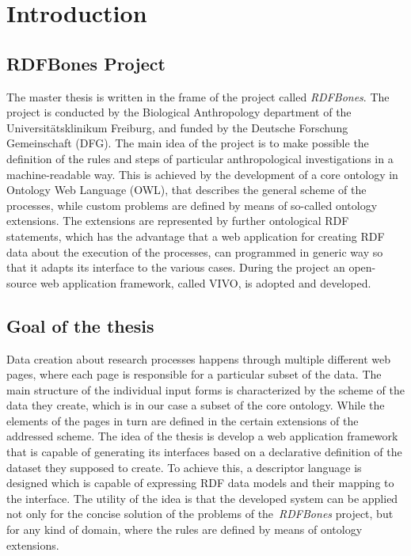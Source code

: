 \chapter{Introduction}


\section{RDFBones Project}

The master thesis is written in the frame of the project called \textit{RDFBones}. The project is conducted by the Biological Anthropology department of the Universitätsklinikum Freiburg, and funded by the Deutsche Forschung Gemeinschaft (DFG). The main idea of the project is to make possible the definition of the rules and steps of particular anthropological investigations in a machine-readable way. This is achieved by the development of a core ontology in Ontology Web Language (OWL), that describes the general scheme of the processes, while custom problems are defined by means of so-called ontology extensions. The extensions are represented by further ontological RDF statements, which has the advantage that a web application for creating RDF data about the execution of the processes, can programmed in generic way so that it adapts its interface to the various cases. During the project an open-source web application framework, called VIVO, is adopted and developed.

\section{Goal of the thesis}

Data creation about research processes happens through multiple different web pages, where each page is responsible for a particular subset of the data. The main structure of the individual input forms is characterized by the scheme of the data they create, which is in our case a subset of the core ontology. While the elements of the pages in turn are defined in the certain extensions of the addressed scheme. The idea of the thesis is develop a web application framework that is capable of generating its interfaces based on a declarative definition of the dataset they supposed to create. To achieve this, a descriptor language is designed which is capable of expressing RDF data models  and their mapping to the interface. The utility of the idea is that the developed system can be applied not only for the concise solution of the problems of the \textit{RDFBones} project, but for any kind of domain, where the rules are defined by means of ontology extensions.


